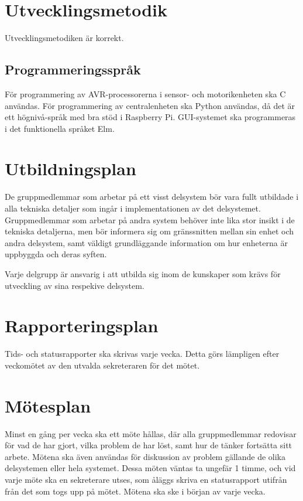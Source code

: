 \documentclass[a4paper,titlepage,12pt]{article}
\begin{document}
	
	\section{Utvecklingsmetodik}
    Utvecklingsmetodiken är korrekt.

    \subsection{Programmeringsspråk}
    För programmering av AVR-processorerna i sensor- och motorikenheten ska C
    användas. För programmering av centralenheten ska Python användas, då det
    är ett högnivå-språk med bra stöd i Raspberry Pi. GUI-systemet ska
    programmeras i det funktionella språket Elm.
	
	\section{Utbildningsplan}

    De gruppmedlemmar som arbetar på ett visst delsystem bör vara fullt
    utbildade i alla tekniska detaljer som ingår i implementationen av det
    delsystemet. Gruppmedlemmar som arbetar på andra system behöver inte lika
    stor insikt i de tekniska detaljerna, men bör
    informera sig om gränssnitten mellan sin enhet och andra delsystem, samt väldigt 
    grundläggande information om hur enheterna är uppbyggda och deras syften.

    Varje delgrupp är ansvarig i att utbilda sig inom de kunskaper som krävs
    för utveckling av sina respekive delsystem.

	\section{Rapporteringsplan}
	Tids- och statusrapporter ska skrivas varje vecka. Detta görs lämpligen
    efter veckomötet av den utvalda sekreteraren för det mötet.
	
	\section{Mötesplan}
    Minst en gång per vecka ska ett möte hållas, där alla gruppmedlemmar
    redovisar för vad de har gjort, vilka problem de har löst, samt hur de
    tänker fortsätta sitt arbete. Mötena ska även användas för diskussion av
    problem gällande de olika delsystemen eller hela systemet. Dessa möten väntas 
    ta ungefär 1 timme, och vid varje möte ska en sekreterare utses, som åläggs skriva 
    en statusrapport utifrån från det som togs upp på mötet. Mötena ska ske i början av
    varje vecka.
	
\end{document}
